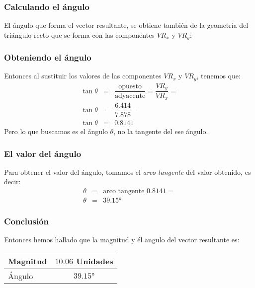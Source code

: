 \documentclass[14pt, xcolor={usenames,dvipsnames}]{beamer}
\begin{document}
\begin{frame}
\frametitle{Calculando el ángulo}
\fontsize{12}{12}\selectfont
El ángulo que forma el vector resultante, se obtiene también de la geometría del triángulo recto que se forma con las componentes $VR_{x}$ y $VR_{y}$:
\begin{figure}
    \centering
    \end{figure}
\end{frame}
\begin{frame}
\frametitle{Obteniendo el ángulo}
Entonces al sustituir los valores de las componentes $VR_{x}$ y $VR_{y}$, tenemos que:
\begin{eqnarray*}
\tan \theta &=& \dfrac{\text{opuesto}}{\text{adyacente}} = \dfrac{VR_{y}}{VR_{x}} = \\[0.5em]
\tan \theta &=& \dfrac{6.414}{7.878} = \\[0.5em]
\tan \theta &=& 0.8141
\end{eqnarray*}
\pause
Pero lo que buscamos es el ángulo $\theta$, no la tangente del ese ángulo.
\end{frame}
\begin{frame}
\frametitle{El valor del ángulo}
Para obtener el valor del ángulo, tomamos el \emph{arco tangente} del valor obtenido, es decir:
\pause
\begin{eqnarray*}
\theta &=& \text{arco tangente } 0.8141 = \\[0.5em]
\theta &=& \ang{39.15}
\end{eqnarray*}
\end{frame}
\begin{frame}
\frametitle{Conclusión}
Entonces hemos hallado que la magnitud y él angulo del vector resultante es:
\renewcommand{\arraystretch}{1.5}
\begin{table}
\begin{tabular}{l | c}
Magnitud & $10.06$ Unidades \\ \hline
Ángulo & $\ang{39.15}$
\end{tabular}
\end{table}
\end{frame}
\end{document}

